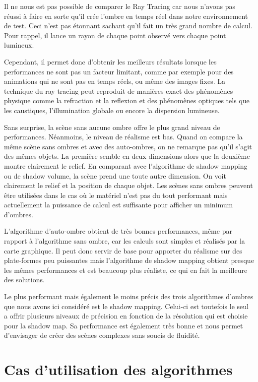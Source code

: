 \documentclass[a4paper,12pt]{report}
\begin{document}
Il ne nous est pas possible de comparer le Ray Tracing car nous n'avons pas réussi à faire en sorte qu'il crée l'ombre en temps réel dans notre environnement de test. Ceci n'est pas étonnant sachant qu'il fait un très grand nombre de calcul. Pour rappel, il lance un rayon de chaque point observé vers chaque point lumineux.

Cependant, il permet donc d'obtenir les meilleurs résultats lorsque les performances ne sont pas un facteur limitant, comme par exemple pour des animations qui ne sont pas en temps réels, ou même des images fixes. La technique du ray tracing peut reproduit de manières exact des phénomènes physique comme la refraction et la reflexion et des phénomènes optiques tels que les caustiques, l'illumination globale ou encore la dispersion lumineuse.

Sans surprise, la scène sans aucune ombre offre le plus grand niveau de performances. Néanmoins, le niveau de réalisme est bas. Quand on compare la même scène sans ombres et avec des auto-ombres, on ne remarque pas qu'il s'agit des mêmes objets. La première semble en deux dimensions alors que la deuxième montre clairement le relief. En comparant avec l'algorithme de shadow mapping ou de shadow volume, la scène prend une toute autre dimension. On voit clairement le relief et la position de chaque objet.
Les scènes sans ombres peuvent \^etre utilisées dans le cas où le matériel n'est pas du tout performant mais actuellement la puissance de calcul est suffisante pour afficher un minimum d'ombres.


L'algorithme d'auto-ombre obtient de très bonnes performances, même par rapport à l'algorithme sans ombre, car les calculs sont simples et réalisés par la carte graphique. Il peut donc servir de base pour apporter du réalisme sur des plate-formes peu puissantes mais l'algorithme de shadow mapping obtient presque les mêmes performances et est beaucoup plus réaliste, ce qui en fait la meilleure des solutions.

Le plus performant mais également le moins précis des trois algorithmes d'ombres que nous avons ici considéré est le shadow mapping. Celui-ci est toutefois le seul a offrir plusieurs niveaux de précision en fonction de la résolution qui est choisie pour la shadow map. Sa performance est également très bonne et nous permet d'envisager de créer des scènes complexes sans soucis de fluidité.

\section{Cas d'utilisation des algorithmes}
\end{document}
